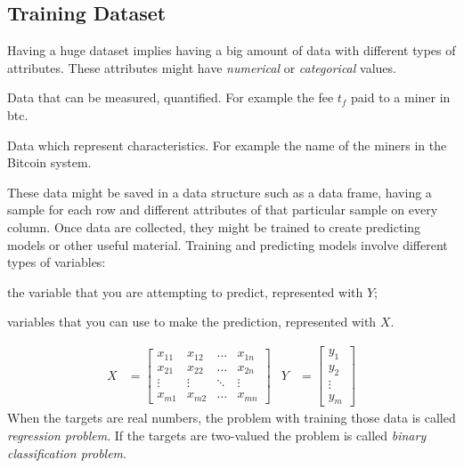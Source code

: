 \documentclass[USenglish]{uit-thesis}
\begin{document}
\subsection{Training Dataset}
\label{sec:trainingdataset}
Having a huge dataset implies having a big amount
of data with different types of attributes.
These attributes might have
\emph{numerical} or \emph{categorical} values. 
\begin{description}[leftmargin=!, labelwidth=\widthof{\bfseries -Categorical- }, noitemsep]
	\item [Numerical:] Data that can be measured, quantified. For example
	the fee $t_f$ paid to a miner in \gls{btc}.
	\item [Categorical:]Data which represent characteristics. For
	example the name of the miners in the Bitcoin system.
\end{description}
These data might be saved in a data structure such as a data frame,
having a sample for each row and different attributes of that particular
sample on every column.
Once data are collected, they might be trained
to create predicting
models or other useful material.
Training and predicting models involve
different types of variables:
\begin{description}[leftmargin=!, labelwidth=\widthof{\bfseries -Target variables- }, noitemsep]
	\item[Target variables:] the variable that you are attempting to predict, represented with $Y$;
	\item[Predictors:] variables that you can use to make the prediction, represented with $X$.
\end{description}
\begin{align}
X &=\begin{bmatrix}
x_{11} & x_{12}  & \dots & x_{1n}\\
x_{21} & x_{22} & \dots & x_{2n}\\
\vdots & \vdots & \ddots& \vdots\\
x_{m1} & x_{m2} & \dots & x_{mn}
\end{bmatrix} &
Y &=\begin{bmatrix}
y_{1}\\
y_{2}\\
\vdots\\
y_{m}
\end{bmatrix} 
\end{align}
When the targets are real numbers,
the problem with training those data is called
\emph{regression problem}. If the targets are two-valued
the problem is called \emph{binary classification problem}.
\end{document}

